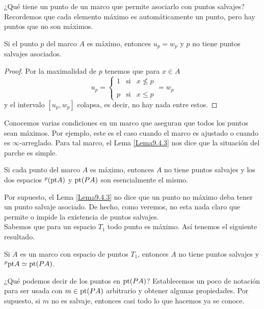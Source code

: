 ¿Qué tiene un punto de un marco que permite asociarlo con puntos salvajes? Recordemos que cada elemento máximo es automáticamente un punto, pero hay puntos que no son máximos.

\begin{lem}\label{Lema9.4.3}
    Si el punto $p$ del marco $A$ es máximo, entonces $u_p=w_p$ y $p$ no tiene puntos salvajes asociados.
\end{lem}

\begin{proof}
    Por la maximalidad de $p$ tenemos que para $x\in A$
    \[
    u_p=\left\{ \begin{array}{lcc} 1 & \mbox{si} & x \nleq p\\ \\ 
    p & \mbox{si} & x\leq p  \end{array} \right.=w_p
    \]
    y el intervalo $[u_p, w_p]$ colapsa, es decir, no hay nada entre estos.
\end{proof}

Conocemos varias condiciones en un marco que aseguran que todos los puntos sean máximos. Por ejemplo, este es el caso cuando el marco es ajustado o cuando es $\infty$-arreglado. Para tal marco, el Lema \ref{Lema9.4.3} nos dice que la situación del parche es simple.

\begin{thm}\label{Teorema9.4.4}
    Si cada punto del marco $A$ es máximo, entonces $A$ no tiene puntos salvajes y los dos espacios $^p(\mathrm{pt} A)$ y $\mathrm{pt}(PA)$ son esencialmente el mismo.
\end{thm}

Por supuesto, el Lema \ref{Lema9.4.3} no dice que un punto no máximo deba tener un punto salvaje asociado. De hecho, como veremos, no esta nada claro que permite o impide la existencia de puntos salvajes.\\

Sabemos que para un espacio $T_1$ todo punto es máximo. Así tenemos el siguiente resultado.

\begin{cor}\label{Corolario9.4.5}
    Si $A$ es un marco con espacio de puntos $T_1$, entonces $A$ no tiene puntos salvajes y $^p\mathrm{pt} A\simeq \mathrm{pt} (PA)$.
\end{cor}

¿Qué podemos decir de los puntos en $\mathrm{pt}(PA)$? Establecemos un poco de notación para ser usada con $m\in \mathrm{pt}(PA)$ arbitrario y obtener algunas propiedades. Por supuesto, si $m$ no es salvaje, entonces casi todo lo que hacemos ya se conoce.\\

